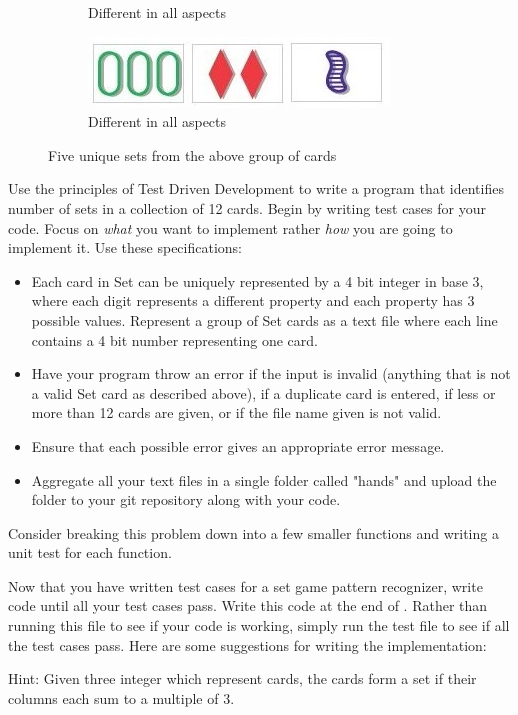 \begin{problem}
\begin{figure}[H]
\begin{subfigure}{.47\textwidth}
    \caption{Different in all aspects}
    \label{fig:labeltheotherfigure}
\end{subfigure}
\begin{subfigure}{.48\textwidth}
    \centering
    \includegraphics[width=\linewidth]{figures/set5.jpg}
    \caption{Different in all aspects}
    \label{fig:labeltheotherfigure}
\end{subfigure}
\caption{Five unique sets from the above group of cards}
\end{figure}


\vspace{5mm}

Use the principles of Test Driven Development to write a program that identifies number of sets in a collection of 12 cards. Begin by writing test cases for your code. Focus on \textit{what} you want to implement rather \textit{how} you are going to implement it. Use these specifications:
\begin{itemize}
\item Each card in Set can be uniquely represented by a 4 bit integer in base 3, where each digit represents a different property and each property has 3 possible values. Represent a group of Set cards as a text file where each line contains a 4 bit number representing one card.
\item Have your program throw an error if the input is invalid (anything that is not a valid Set card as described above),  if a duplicate card is entered, if less or more than 12 cards are given, or if the file name given is not valid.
\item Ensure that each possible error gives an appropriate error message.
\item Aggregate all your text files in a single folder called "hands" and upload the folder to your git repository along with your code.
\end{itemize}

Consider breaking this problem down into a few smaller functions and writing a unit test for each function.

\end{problem}

\begin{problem}
Now that you have written test cases for a set game pattern recognizer, write code until all your test cases pass. Write this code at the end of . Rather than running this file to see if your code is working, simply run the test file to see if all the test cases pass. Here are some suggestions for writing the implementation:

Hint: Given three integer which represent cards, the cards form a set if their columns each sum to a multiple of 3.

\end{problem}

